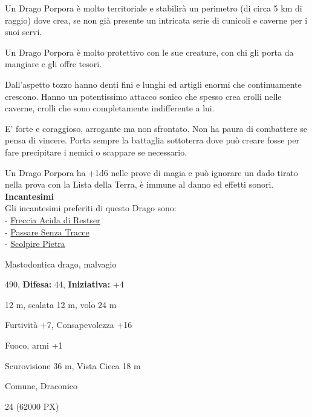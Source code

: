 \begin{multicols}{2}
{Un Drago Porpora è molto territoriale e stabilirà un perimetro (di circa 5 km di raggio) dove crea, se non già presente un intricata serie di cunicoli e caverne per i suoi servi.

Un Drago Porpora è molto protettivo con le sue creature, con chi gli porta da mangiare e gli offre tesori.

Dall'aspetto tozzo hanno denti fini e lunghi ed artigli enormi che continuamente crescono. Hanno un potentissimo attacco sonico che spesso crea crolli nelle caverne, crolli che sono completamente indifferente a lui.

E' forte e coraggioso, arrogante ma non sfrontato. Non ha paura di combattere se pensa di vincere. Porta sempre la battaglia sottoterra dove può creare fosse per fare precipitare i nemici o scappare se necessario.

Un Drago Porpora ha +1d6 nelle prove di magia e può ignorare un dado tirato nella prova con la Lista della Terra, è immune al danno ed effetti sonori.\\
\textbf{Incantesimi}\\
Gli incantesimi preferiti di questo Drago sono:\\
- \hyperlink{Freccia Acida di Restser}{Freccia Acida di Restser}\\
- \hyperlink{Passare Senza Tracce}{Passare Senza Tracce}\\
- \hyperlink{Scolpire Pietra}{Scolpire Pietra}

\noindent
\begin{description}[noitemsep, topsep=0pt, parsep=0pt, partopsep=0pt, leftmargin=0cm, labelwidth=2.2cm]
	\item[\textbf{Taglia/Tipo:}] Mastodontica drago, malvagio
	\item[\textbf{Caratt.:}] 
	\item[\textbf{Punti Ferita:}] 490,  \textbf{Difesa:} 44,  \textbf{Iniziativa:} +4
	\item[\textbf{Movimento:}] 12 m, scalata 12 m, volo 24 m
	\item[\textbf{Tiri Salvez.:}] 
	\item[\textbf{Comp.:}] Furtività +7, Consapevolezza +16
	\item[\textbf{Imm. Danni:}] Fuoco, armi +1
	\item[\textbf{Sensi:}] Scurovisione 36 m, Vista Cieca 18 m
	\item[\textbf{Linguaggi:}] Comune, Draconico
	\item[\textbf{Sfida:}] 24 (62000 PX)\smallskip
\end{description}

}
\end{multicols}

